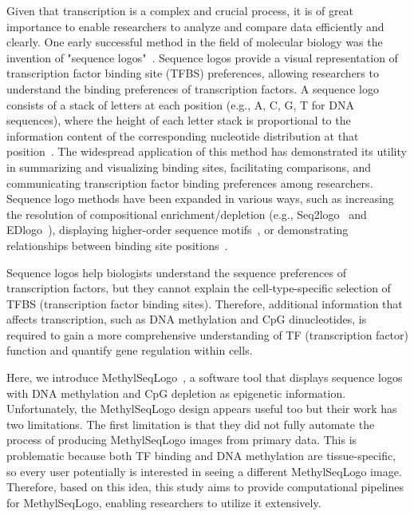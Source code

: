 \documentclass{PHlab-thesis}
\begin{document}
Given that transcription is a complex and crucial process, it is of great importance to enable researchers to analyze and compare data efficiently and clearly. One early successful method in the field of molecular biology was the invention of "sequence logos"~\cite{schneider1990sequence}. Sequence logos provide a visual representation of transcription factor binding site (TFBS) preferences, allowing researchers to understand the binding preferences of transcription factors. A sequence logo consists of a stack of letters at each position (e.g., {A, C, G, T} for DNA sequences), where the height of each letter stack is proportional to the information content of the corresponding nucleotide distribution at that position~\cite{schneider1990sequence}. The widespread application of this method has demonstrated its utility in summarizing and visualizing binding sites, facilitating comparisons, and communicating transcription factor binding preferences among researchers. Sequence logo methods have been expanded in various ways, such as increasing the resolution of compositional enrichment/depletion (e.g., Seq2logo~\cite{Seq2Logo10.1093/nar/gks469} and EDlogo~\cite{Dey2018sequencelogo}), displaying higher-order sequence motifs~\cite{10.1093/nar/gky497}, or demonstrating relationships between binding site positions~\cite{Siebert2016Bayesian}.

Sequence logos help biologists understand the sequence preferences of transcription factors, but they cannot explain the cell-type-specific selection of TFBS (transcription factor binding sites). Therefore, additional information that affects transcription, such as DNA methylation and CpG dinucleotides, is required to gain a more comprehensive understanding of TF (transcription factor) function and quantify gene regulation within cells. 

Here, we introduce MethylSeqLogo~\cite{Hsu2022.11.05.515271}, a software tool that displays sequence logos with DNA methylation and CpG depletion as epigenetic information. Unfortunately, the MethylSeqLogo design appears useful too but their work has two limitations. The first limitation is that they did not fully automate the process of producing MethylSeqLogo images from primary data. This is problematic because both TF binding and DNA methylation are tissue-specific, so every user potentially is interested in seeing a different MethylSeqLogo image. Therefore, based on this idea, this study aims to provide computational pipelines for MethylSeqLogo, enabling researchers to utilize it extensively.
\end{document}
